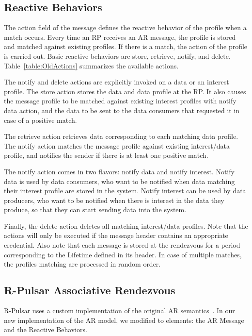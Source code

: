 \subsection{Reactive Behaviors} 

The action field of the message defines the reactive behavior of the profile when a match occurs. Every time an RP receives an AR message, the profile is stored and matched against existing profiles. If there is a match, the action of the profile is carried out. Basic reactive behaviors are store, retrieve, notify, and delete. Table~\ref{table:OldActions} summarizes the available actions.

The notify and delete actions are explicitly invoked on a data or an interest profile. The store action stores the data and data profile at the RP. It also causes the message profile to be matched against existing interest profiles with notify data action, and the data to be sent to the data consumers that requested it in case of a positive match.

The retrieve action retrieves data corresponding to each matching data profile. The notify action matches the message profile against existing interest/data profile, and notifies the sender if there is at least one positive match. 

The notify action comes in two flavors: notify data and notify interest. Notify data is used by data consumers, who want to be notified when data matching their interest profile are stored in the system. Notify interest can be used by data producers, who want to be notified when there is interest in the data they produce, so that they can start sending data into the system.

Finally, the delete action deletes all matching interest/data profiles. Note that the actions will only be executed if the message header contains an appropriate credential. Also note that each message is stored at the rendezvous for a period corresponding to the Lifetime defined in its header. In case of multiple matches, the profiles matching are processed in random order.

\subsection{R-Pulsar Associative Rendezvous}\label{sec:semantics}
R-Pulsar uses a custom implementation of the original AR semantics~\cite{meteor2008}. In our new implementation of the AR model, we modified to elements: the AR Message and the Reactive Behaviors.

